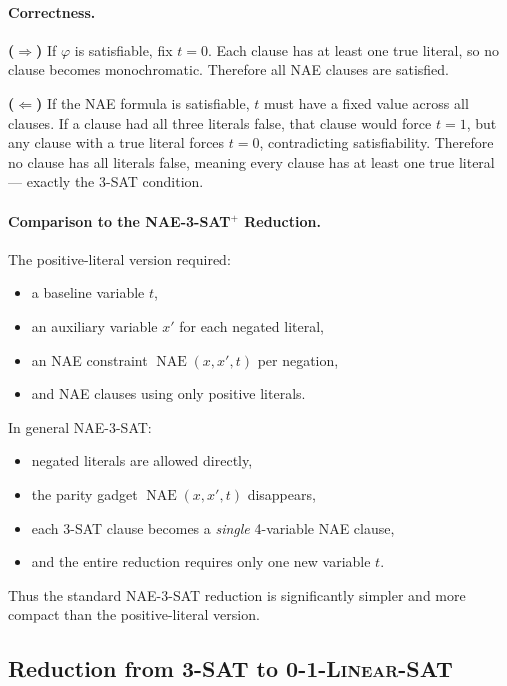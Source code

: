 \documentclass[9pt]{extarticle}
\begin{document}
\paragraph{Correctness.}

\textbf{($\Rightarrow$)} If $\varphi$ is satisfiable, fix $t = 0$.  
Each clause has at least one true literal, so no clause becomes monochromatic.
Therefore all NAE clauses are satisfied.

\textbf{($\Leftarrow$)} If the NAE formula is satisfiable, $t$ must have a fixed
value across all clauses.  
If a clause had all three literals false, that clause would force $t=1$, but
any clause with a true literal forces $t=0$, contradicting satisfiability.  
Therefore no clause has all literals false, meaning every clause has at least
one true literal — exactly the 3-SAT condition.

\paragraph{Comparison to the \textsc{NAE-3-SAT}$^+$ Reduction.}

The positive-literal version required:
\begin{itemize}
    \item a baseline variable $t$,
    \item an auxiliary variable $x'$ for each negated literal,
    \item an NAE constraint $\operatorname{NAE}(x,x',t)$ per negation,
    \item and NAE clauses using only positive literals.
\end{itemize}

In general NAE-3-SAT:
\begin{itemize}
    \item negated literals are allowed directly,
    \item the parity gadget $\operatorname{NAE}(x,x',t)$ disappears,
    \item each 3-SAT clause becomes a \emph{single} 4-variable NAE clause,
    \item and the entire reduction requires only one new variable $t$.
\end{itemize}

Thus the standard NAE-3-SAT reduction is significantly simpler and more compact
than the positive-literal version.


\subsection{Reduction from \textsc{3-SAT} to \textsc{0-1-Linear-SAT}}
\end{document}
